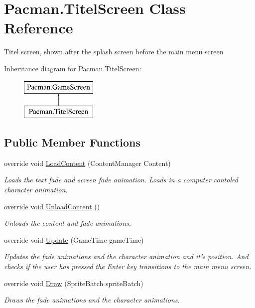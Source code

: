 \hypertarget{class_pacman_1_1_titel_screen}{\section{Pacman.\-Titel\-Screen Class Reference}
\label{class_pacman_1_1_titel_screen}
}


Titel screen, shown after the splash screen before the main menu screen  


Inheritance diagram for Pacman.\-Titel\-Screen\-:\begin{figure}[H]
\begin{center}
\leavevmode
\includegraphics[height=2.000000cm]{class_pacman_1_1_titel_screen}
\end{center}
\end{figure}
\subsection*{Public Member Functions}
\begin{DoxyCompactItemize}
\item 
override void \hyperlink{class_pacman_1_1_titel_screen_aaeeb7b4a31657e20e6d37926d38e5c31}{Load\-Content} (Content\-Manager Content)
\begin{DoxyCompactList}\small\item\em Loads the text fade and screen fade animation. Loads in a computer contoled character animation. \end{DoxyCompactList}\item 
override void \hyperlink{class_pacman_1_1_titel_screen_ae9feed8a91c5fe3da560994fe4258fb2}{Unload\-Content} ()
\begin{DoxyCompactList}\small\item\em Unloads the content and fade animations. \end{DoxyCompactList}\item 
override void \hyperlink{class_pacman_1_1_titel_screen_a287b7f099f4336dbc7b4e232d062441a}{Update} (Game\-Time game\-Time)
\begin{DoxyCompactList}\small\item\em Updates the fade animations and the character animation and it's position. And checks if the user has pressed the Enter key transitions to the main menu screen. \end{DoxyCompactList}\item 
override void \hyperlink{class_pacman_1_1_titel_screen_ae86c21742cdd405fd4467b67b509bc6d}{Draw} (Sprite\-Batch sprite\-Batch)
\begin{DoxyCompactList}\small\item\em Draws the fade animations and the character animations. \end{DoxyCompactList}\end{DoxyCompactItemize}
